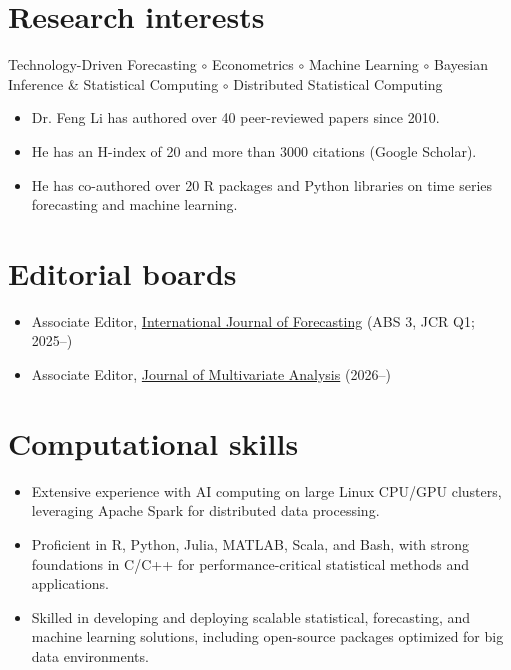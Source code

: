 \documentclass[twoside,a4paper]{article}
\begin{document}
\section{Research interests}

Technology-Driven Forecasting $\circ$ Econometrics $\circ$ Machine Learning $\circ$ Bayesian Inference \& Statistical Computing $\circ$ Distributed Statistical Computing

\begin{itemize}
\item Dr. Feng Li has authored over 40 peer-reviewed papers since 2010.
\item He has an H-index of 20 and more than 3000 citations (Google Scholar).
\item He has co-authored over 20 R packages and Python libraries on time series forecasting and machine learning.
\end{itemize}


\section{Editorial boards}

\begin{itemize}
\item Associate Editor, \href{https://www.sciencedirect.com/journal/international-journal-of-forecasting}{International Journal of Forecasting} (ABS 3, JCR Q1; 2025--)
\item Associate Editor, \href{https://www.sciencedirect.com/journal/journal-of-multivariate-analysis}{Journal of Multivariate Analysis} (2026--)
\end{itemize}

\section{Computational skills}
\begin{itemize}

\item Extensive experience with AI computing on large Linux CPU/GPU clusters, leveraging Apache Spark for distributed data processing.

\item Proficient in R, Python, Julia, MATLAB, Scala, and Bash, with strong foundations in C/C++ for performance-critical statistical methods and applications.

\item Skilled in developing and deploying scalable statistical, forecasting, and machine learning solutions, including open-source packages optimized for big data environments.

\end{itemize}
\end{document}
